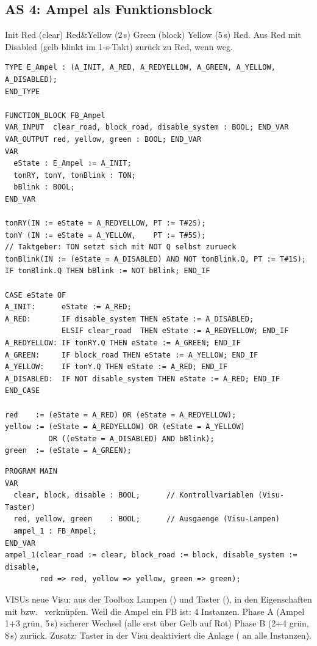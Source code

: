 \subsection{AS 4: Ampel als Funktionsblock}
\label{bsp:ampelfb}
Init \ra Red \ra(clear) Red\&Yellow \ra(2\,s) Green \ra(block) Yellow
\ra(5\,s) Red. Aus Red mit  \ra Disabled (gelb blinkt
im 1-s-Takt) \ra zurück zu Red, wenn  weg.
\begin{lstlisting}
TYPE E_Ampel : (A_INIT, A_RED, A_REDYELLOW, A_GREEN, A_YELLOW, A_DISABLED);
END_TYPE

FUNCTION_BLOCK FB_Ampel
VAR_INPUT  clear_road, block_road, disable_system : BOOL; END_VAR
VAR_OUTPUT red, yellow, green : BOOL; END_VAR
VAR
  eState : E_Ampel := A_INIT;
  tonRY, tonY, tonBlink : TON;
  bBlink : BOOL;
END_VAR

tonRY(IN := eState = A_REDYELLOW, PT := T#2S);
tonY (IN := eState = A_YELLOW,    PT := T#5S);
// Taktgeber: TON setzt sich mit NOT Q selbst zurueck
tonBlink(IN := (eState = A_DISABLED) AND NOT tonBlink.Q, PT := T#1S);
IF tonBlink.Q THEN bBlink := NOT bBlink; END_IF

CASE eState OF
A_INIT:      eState := A_RED;
A_RED:       IF disable_system THEN eState := A_DISABLED;
             ELSIF clear_road  THEN eState := A_REDYELLOW; END_IF
A_REDYELLOW: IF tonRY.Q THEN eState := A_GREEN; END_IF
A_GREEN:     IF block_road THEN eState := A_YELLOW; END_IF
A_YELLOW:    IF tonY.Q THEN eState := A_RED; END_IF
A_DISABLED:  IF NOT disable_system THEN eState := A_RED; END_IF
END_CASE

red    := (eState = A_RED) OR (eState = A_REDYELLOW);
yellow := (eState = A_REDYELLOW) OR (eState = A_YELLOW)
          OR ((eState = A_DISABLED) AND bBlink);
green  := (eState = A_GREEN);
\end{lstlisting}
\begin{lstlisting}
PROGRAM MAIN
VAR
  clear, block, disable : BOOL;      // Kontrollvariablen (Visu-Taster)
  red, yellow, green    : BOOL;      // Ausgaenge (Visu-Lampen)
  ampel_1 : FB_Ampel;
END_VAR
ampel_1(clear_road := clear, block_road := block, disable_system := disable,
        red => red, yellow => yellow, green => green);
\end{lstlisting}
 VISUs \ra neue Visu; aus der Toolbox Lampen
() und Taster (), in den Eigenschaften mit
 bzw.\  verknüpfen.
 Weil die Ampel ein FB ist: 4 Instanzen. Phase A (Ampel 1+3
grün, 5\,s) \ra sicherer Wechsel (alle erst über Gelb auf Rot) \ra Phase B
(2+4 grün, 8\,s) \ra zurück. Zusatz: Taster in der Visu deaktiviert die
Anlage ( an alle Instanzen).
